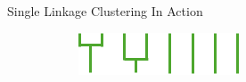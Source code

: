 \documentclass{beamer}
\begin{document}
\begin{frame}{Single Linkage Clustering In Action}
{\begin{figure}[!h]
\begin{subfigure}{.2\linewidth}
    \end{subfigure}%
    \hspace{5em}
    \begin{subfigure}{.5\linewidth}
      \centering
      \includegraphics[width=.9\textwidth]{sixdend.png}
    \end{subfigure}
    \end{figure}}



\end{frame}
\end{document}
